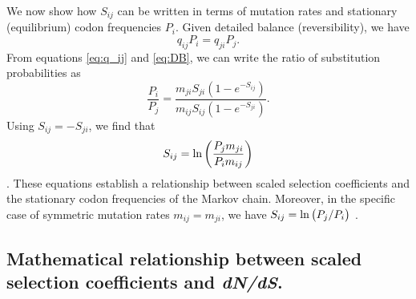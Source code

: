 \documentclass[11pt]{article}
\begin{document}
We now show how $S_{ij}$ can be written in terms of mutation rates and stationary (equilibrium) codon frequencies $P_i$. Given detailed balance (reversibility), we have 
\begin{equation}\label{eq:DB}
q_{ij}P_i = q_{ji}P_j .
\end{equation} From equations \eqref{eq:q_ij} and \eqref{eq:DB}, we can write the ratio of substitution probabilities as 
\begin{equation}\label{ratio_q_ij}
\frac{P_i}{P_j} = \frac{m_{ji} S_{ji} (1-e^{-S_{ij}})} {m_{ij} S_{ij} (1-e^{-S_{ji}})} .
\end{equation} Using $S_{ij} = -S_{ji}$, we find that
\begin{equation}\label{eq:s_pmu}
S_{ij} = \ln\bigg{(} \frac{P_jm_{ji}}{P_im_{ij}} \bigg{)} 
\end{equation} \cite{HalpernBruno1998}. These equations establish a relationship between scaled selection coefficients and the stationary codon frequencies of the Markov chain. Moreover, in the specific case of symmetric mutation rates $m_{ij} = m_{ji}$, we have $S_{ij} = \ln\big{(}P_j/P_i\big{)}$ \cite{SellaHirsh2005}. 


		
\subsection*{Mathematical relationship between scaled selection coefficients and \emph{dN/dS}.} 
\end{document}
